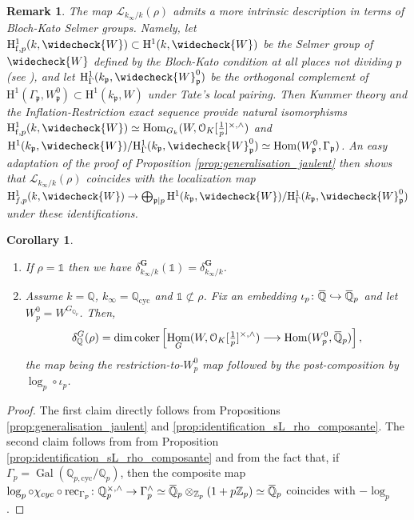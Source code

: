 \documentclass[12pt]{amsart}
\newcommand{\Q}{\mathbb{Q}}
\newcommand\bQ{\mathbb{Q}}
\newcommand\Zp{{\mathbb{Z}_p}}
\newcommand\Qp{{\mathbb{Q}_p}}
\newcommand\cO{\mathcal{O}}
\newcommand\gp{\mathfrak{p}}
\newcommand\sL{\mathscr{L}}
\newcommand{\ob}[1]{\mkern 1.5mu\overline{\mkern-1.5mu#1\mkern-1.5mu}\mkern 1.5mu}
\DeclareMathOperator{\Gal}{Gal}
\DeclareMathOperator{\Hom}{Hom}
\DeclareMathOperator{\coker}{coker}
\DeclareMathOperator{\rec}{rec}
\newcommand{\cyc}{\textrm{cyc}}
\newcommand{\HH}{\mathrm{H}}
\newcommand{\ff}{\mathrm{f}}
\theoremstyle{defstyle}
\newtheorem{remark}[subsubsection]{Remark}
\theoremstyle{thmstyle}
\newtheorem{corollaire}[subsubsection]{Corollary}
\begin{document}
	\begin{remark}
		The map $\sL_{k_\infty/k}(\rho)$ admits a more intrinsic description in terms of Bloch-Kato Selmer groups. Namely, let $\HH^1_{\ff,p}(k,\widecheck{W})\subset \HH^1(k,\widecheck{W})$ be the Selmer group of $\widecheck{W}$ defined by the Bloch-Kato condition at all places not dividing $p$ (see \cite[\S~3]{blochkato}), and let $\HH^1_\Gamma(k_\gp,\widecheck{W}^0_\gp)$ be the orthogonal complement of $\HH^1(\Gamma_\gp,W^0_\gp)\subset \HH^1(k_\gp,W)$ under Tate's local pairing. Then Kummer theory and the Inflation-Restriction exact sequence provide natural isomorphisms $\HH^1_{\ff,p}(k,\widecheck{W})\simeq \Hom_{G_k}(W,\cO_K[\tfrac{1}{p}]^{\times,\wedge})$ and $\HH^1(k_\gp,\widecheck{W})/\HH^1_\Gamma(k_\gp,\widecheck{W}^0_\gp)\simeq \Hom(W_\gp^0,\Gamma_\gp)$. An easy adaptation of the proof of Proposition \ref{prop:generalisation_jaulent} then shows that $\sL_{k_\infty/k}(\rho)$ coincides with the localization map $\HH^1_{f,p}(k,\widecheck{W}) \rightarrow \bigoplus_{\gp|p} \HH^1(k_\gp,\widecheck{W})/\HH^1_\Gamma(k_\gp,\widecheck{W}^0_\gp)$ under these identifications.
	\end{remark}
	\begin{corollaire}\label{coro:formule_gross_defect_over_Q}
		\begin{enumerate}
			\item 
			If $\rho=\mathds{1}$ then we have $\delta^\textbf{G}_{k_\infty/k}(\mathds{1})=\delta^\textbf{G}_{k_\infty/k}$. 
			\item Assume $k=\bQ$, $k_\infty=\bQ_{\cyc}$ and $\mathds{1}\not \subset \rho$. Fix an embedding $\iota_p \colon \ob{\Q} \hookrightarrow \ob{\Q}_p$ and let $W_p^0=W^{G_{\Qp}}$. Then,
			\begin{equation*}
				\delta^\textbf{G}_\Q(\rho)=\dim \coker\left[\Hom_G(W,\cO_K[\tfrac{1}{p}]^{\times,\wedge})  \longrightarrow \Hom(W_p^0,\ob{\Q}_p) \right],
			\end{equation*}
			the map being the restriction-to-$W_p^0$ map followed by the post-composition by $\log_p \circ \iota_p$.
		\end{enumerate} 
	\end{corollaire}
	\begin{proof}
		The first claim directly follows from Propositions \ref{prop:generalisation_jaulent} and \ref{prop:identification_sL_rho_composante}. The second claim follows from from Proposition \ref{prop:identification_sL_rho_composante} and from the fact that, if $\Gamma_p=\Gal(\Q_{p,\cyc}/\Qp)$, then the composite map $\log_p \circ \chi_{\cyc} \circ \rec_{\Gamma_p} \colon \Q_p^{\times,\wedge} \to \Gamma_p^\wedge \simeq \ob{\Q}_p \otimes_{\Zp} (1+p\Zp) \simeq \ob{\Q}_p$ coincides with $-\log_p$.
	\end{proof}
	
\end{document}

